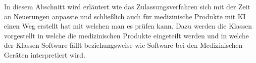 In diesem Abschnitt wird erläutert wie das Zulassungsverfahren sich mit der Zeit an Neuerungen anpasste und schließlich auch für medizinische Produkte mit KI einen Weg erstellt hat mit welchen man es prüfen kann. Dazu werden die Klassen vorgestellt in welche die medizinischen Produkte eingeteilt werden und in welche der Klassen Software fällt beziehungsweise wie Software bei den Medizinischen Geräten interpretiert wird.